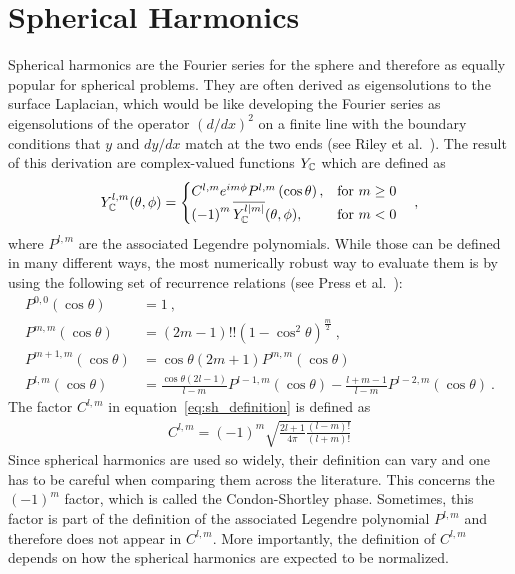 \section{Spherical Harmonics}
\label{sec:sh}

Spherical harmonics are the Fourier series for the sphere and therefore as equally popular for spherical problems. They are often derived as eigensolutions to the surface Laplacian, which would be like developing the Fourier series as eigensolutions of the operator $(d/dx)^2$ on a finite line with the boundary conditions that $y$ and $dy/dx$ match at the two ends (see Riley et al.~\cite{Riley2006}). The result of this derivation are complex-valued functions $Y_{\mathbb{C}}$ which are defined as
\begin{align}
\label{eq:sh_definition}
Y_{\mathbb{C}}^{l,m}(\theta, \phi)=
\begin{cases}
C^{l,m}e^{im\phi}P^{l,m}\left(\operatorname{cos}\theta\right), & \text{for $m\ge0$}\\
\left(-1\right)^m\overline{Y_{\mathbb{C}}^{l\left|m\right|}}(\theta, \phi), & \text{for $m<0$}
\end{cases}
\quad ,
\end{align}
where $P^{l,m}$ are the associated Legendre polynomials. While those can be defined in many different ways, the most numerically robust way to evaluate them is by using the following set of recurrence relations (see Press et al.~\cite{Press07}):
\begin{align}
P^{0,0}\left(\operatorname{cos}\theta\right) &=
1
\  ,
\nonumber
\\
P^{m,m}\left(\operatorname{cos}\theta\right) &=
\left(2m-1\right)!!\left(1-\operatorname{cos}^2\theta\right)^\frac{m}{2}
\  ,
\nonumber
\\
P^{m+1,m}\left(\operatorname{cos}\theta\right) &=
\operatorname{cos}\theta\left(2m+1\right)P^{m,m}\left(\operatorname{cos}\theta\right)
\ 
\nonumber
\\
P^{l,m}\left(\operatorname{cos}\theta\right) &=
\frac{\operatorname{cos}\theta\left(2l-1\right)}{l-m}
P^{l-1,m}\left(\operatorname{cos}\theta\right)
-
\frac{l+m-1}{l-m}
P^{l-2,m}\left(\operatorname{cos}\theta\right)
\  .
\label{eq:sh_Plm}
\end{align}
The factor $C^{l,m}$ in equation~\ref{eq:sh_definition} is defined as
\begin{align}
\label{eq:sh_definition_C}
C^{l,m}=(-1)^m\sqrt{\frac{2l+1}{4\pi}\frac{(l-m)!}{(l+m)!}}
\end{align}
Since spherical harmonics are used so widely, their definition can vary and one has to be careful when comparing them across the literature. This concerns the $(-1)^m$ factor, which is called the Condon-Shortley phase. Sometimes, this factor is part of the definition of the associated Legendre polynomial $P^{l,m}$ and therefore does not appear in $C^{l,m}$. More importantly, the definition of $C^{l,m}$ depends on how the spherical harmonics are expected to be normalized.

